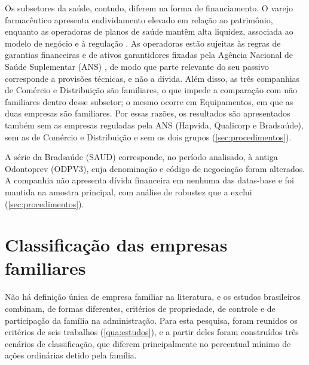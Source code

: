 Os subsetores da saúde, contudo, diferem na forma de financiamento. O varejo
farmacêutico apresenta endividamento elevado em relação ao patrimônio, enquanto as
operadoras de planos de saúde mantêm alta liquidez, associada ao modelo de negócio
e à regulação \cite{andrietta2022}. As operadoras estão sujeitas às regras de
garantias financeiras e de ativos garantidores fixadas pela Agência Nacional de
Saúde Suplementar (ANS) \cite{brasil1998}, de modo que parte relevante do seu
passivo corresponde a provisões técnicas, e não a dívida. Além disso, as três companhias de Comércio e Distribuição são
familiares, o que impede a comparação com não familiares dentro desse subsetor; o
mesmo ocorre em Equipamentos, em que as duas empresas são familiares. Por
essas razões, os resultados são apresentados também sem as empresas reguladas pela
ANS (Hapvida, Qualicorp e Bradsaúde), sem as de Comércio e Distribuição e sem os
dois grupos (\autoref{sec:procedimentos}).

A série da Bradsaúde (SAUD) corresponde, no período analisado, à antiga Odontoprev
(ODPV3), cuja denominação e código de negociação foram alterados. A companhia não
apresenta dívida financeira em nenhuma das datas-base e foi mantida na amostra
principal, com análise de robustez que a exclui (\autoref{sec:procedimentos}).

\section{Classificação das empresas familiares}\label{sec:classificacao}

Não há definição única de empresa familiar na literatura, e os estudos brasileiros
combinam, de formas diferentes, critérios de propriedade, de controle e de
participação da família na administração. Para esta pesquisa, foram reunidos os
critérios de seis trabalhos (\autoref{qua:estudos}), e a partir deles foram
construídos três cenários de classificação, que diferem principalmente no
percentual mínimo de ações ordinárias detido pela família.

